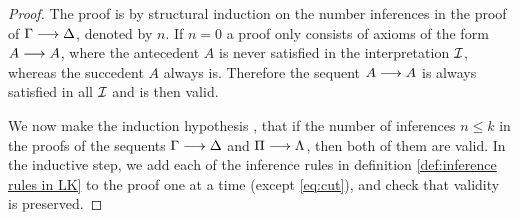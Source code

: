 \documentclass[11pt,a4paper]{article}
\begin{document}
\begin{proof}
    The proof is by structural induction on the number inferences
    in the proof of \(\Gamma\longrightarrow\Delta\), denoted by \(n\).
    If \(n=0\) a proof only consists of axioms of the form \(A\longrightarrow A\),
    where the antecedent \(A\) is never satisfied in the interpretation
    \(\mathcal{I}\), whereas the succedent \(A\) always is. Therefore the
    sequent \(A\longrightarrow A\) is always satisfied in all \(\mathcal{I}\) and is then valid.

    We now make the induction hypothesis \IH, that if the number of inferences
    \(n\leq k\) in the proofs of the sequents \(\Gamma\longrightarrow\Delta\) and \(\Pi\longrightarrow\Lambda\),
    then both of them are valid. In the inductive step, we add each of the inference
    rules in definition \ref{def:inference rules in LK} to the proof one at a time
    (except \eqref{eq:cut}), and check that validity is preserved.


\end{proof}
\end{document}
